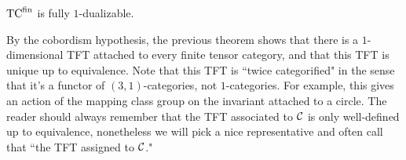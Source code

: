 \documentclass{amsart}
\begin{document}
\begin{proposition}
	${\mathrm{TC}^{\text{fin}}}$ is fully $1$-dualizable. 
\end{proposition}


By the cobordism hypothesis, the previous theorem shows that there is a $1$-dimensional TFT attached to every finite tensor category, and that this TFT is unique up to equivalence.  Note that this TFT is ``twice categorified" in the sense that it's a functor of $(3,1)$-categories, not $1$-categories.  For example, this gives an action of the mapping class group on the invariant attached to a circle.  The reader should always remember that the TFT associated to $\mathcal C$ is only well-defined up to equivalence, nonetheless we will pick a nice representative and often call that ``the TFT assigned to $\mathcal C$."
\end{document}
